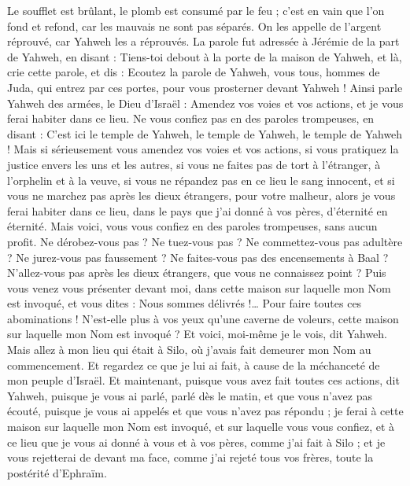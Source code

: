 \begin{multicols}{2}
Le soufflet est brûlant, le plomb est consumé par le feu ; c'est en vain que l'on fond et refond, car les mauvais ne sont pas séparés.
On les appelle de l'argent réprouvé, car Yahweh les a réprouvés.
\VerseOne{}La parole fut adressée à Jérémie de la part de Yahweh, en disant :
Tiens-toi debout à la porte de la maison de Yahweh, et là, crie cette parole, et dis : Ecoutez la parole de Yahweh, vous tous, hommes de Juda, qui entrez par ces portes, pour vous prosterner devant Yahweh !
Ainsi parle Yahweh des armées, le Dieu d'Israël : Amendez vos voies et vos actions, et je vous ferai habiter dans ce lieu.
Ne vous confiez pas en des paroles trompeuses, en disant : C'est ici le temple de Yahweh, le temple de Yahweh, le temple de Yahweh !
Mais si sérieusement vous amendez vos voies et vos actions, si vous pratiquez la justice envers les uns et les autres,
si vous ne faites pas de tort à l'étranger, à l'orphelin et à la veuve, si vous ne répandez pas en ce lieu le sang innocent, et si vous ne marchez pas après les dieux étrangers, pour votre malheur,
alors je vous ferai habiter dans ce lieu, dans le pays que j'ai donné à vos pères, d'éternité en éternité.
Mais voici, vous vous confiez en des paroles trompeuses, sans aucun profit.
Ne dérobez-vous pas ? Ne tuez-vous pas ? Ne commettez-vous pas adultère ? Ne jurez-vous pas faussement ? Ne faites-vous pas des encensements à Baal ? N'allez-vous pas après les dieux étrangers, que vous ne connaissez point ?
Puis vous venez vous présenter devant moi, dans cette maison sur laquelle mon Nom est invoqué, et vous dites : Nous sommes délivrés !… Pour faire toutes ces abominations !
N'est-elle plus à vos yeux qu'une caverne de voleurs, cette maison sur laquelle mon Nom est invoqué ? Et voici, moi-même je le vois, dit Yahweh.
Mais allez à mon lieu qui était à Silo, où j'avais fait demeurer mon Nom au commencement. Et regardez ce que je lui ai fait, à cause de la méchanceté de mon peuple d'Israël.
Et maintenant, puisque vous avez fait toutes ces actions, dit Yahweh, puisque je vous ai parlé, parlé dès le matin, et que vous n'avez pas écouté, puisque je vous ai appelés et que vous n'avez pas répondu ;
je ferai à cette maison sur laquelle mon Nom est invoqué, et sur laquelle vous vous confiez, et à ce lieu que je vous ai donné à vous et à vos pères, comme j'ai fait à Silo ;
et je vous rejetterai de devant ma face, comme j'ai rejeté tous vos frères, toute la postérité d'Ephraïm.

\end{multicols}
